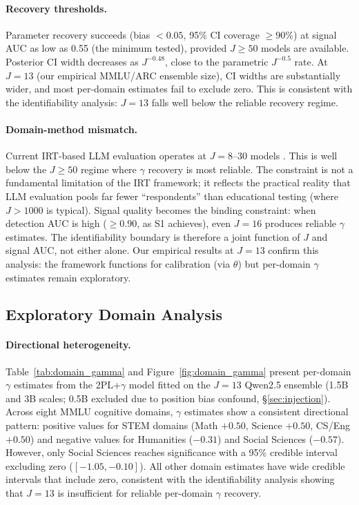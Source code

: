 \paragraph{Recovery thresholds.}
Parameter recovery succeeds (bias $< 0.05$, 95\% CI coverage $\geq 90\%$) at signal AUC as low as 0.55 (the minimum tested), provided $J \geq 50$ models are available. Posterior CI width decreases as $J^{-0.48}$, close to the parametric $J^{-0.5}$ rate. At $J = 13$ (our empirical MMLU/ARC ensemble size), CI widths are substantially wider, and most per-domain estimates fail to exclude zero. This is consistent with the identifiability analysis: $J = 13$ falls well below the reliable recovery regime.

\paragraph{Domain-method mismatch.}
Current IRT-based LLM evaluation operates at $J = 8$--$30$ models \citep{habba_2025_growing_pains, lalor_2024_irt_nlp}. This is well below the $J \geq 50$ regime where $\gamma$ recovery is most reliable. The constraint is not a fundamental limitation of the IRT framework; it reflects the practical reality that LLM evaluation pools far fewer ``respondents'' than educational testing (where $J > 1000$ is typical). Signal quality becomes the binding constraint: when detection AUC is high ($\geq 0.90$, as S1 achieves), even $J = 16$ produces reliable $\gamma$ estimates. The identifiability boundary is therefore a joint function of $J$ and signal AUC, not either alone. Our empirical results at $J = 13$ confirm this analysis: the framework functions for calibration (via $\theta$) but per-domain $\gamma$ estimates remain exploratory.

\subsection{Exploratory Domain Analysis}
\label{sec:domain_differential}

\paragraph{Directional heterogeneity.}
Table~\ref{tab:domain_gamma} and Figure~\ref{fig:domain_gamma} present per-domain $\gamma$ estimates from the 2PL+$\gamma$ model fitted on the $J=13$ Qwen2.5 ensemble (1.5B and 3B scales; 0.5B excluded due to position bias confound, \S\ref{sec:injection}). Across eight MMLU cognitive domains, $\gamma$ estimates show a consistent directional pattern: positive values for STEM domains (Math $+0.50$, Science $+0.50$, CS/Eng $+0.50$) and negative values for Humanities ($-0.31$) and Social Sciences ($-0.57$). However, only Social Sciences reaches significance with a 95\% credible interval excluding zero ($[-1.05, -0.10]$). All other domain estimates have wide credible intervals that include zero, consistent with the identifiability analysis showing that $J = 13$ is insufficient for reliable per-domain $\gamma$ recovery.

